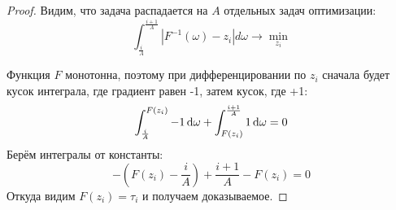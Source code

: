\begin{theorem}
\begin{proof}
Видим, что задача распадается на $A$ отдельных задач оптимизации:
\begin{equation}\label{w1minim}
\int_{\frac{i}{A}}^{\frac{i + 1}{A}} \left| F^{-1}(\omega) - z_i \right| d\omega \to \min_{z_i}
\end{equation}

Функция $F$ монотонна, поэтому при дифференцировании по $z_i$ сначала будет кусок интеграла, где градиент равен -1, затем кусок, где +1:
\begin{equation*}
\int_{\frac{i}{A}}^{F(z_i)} -1 \mathop{}\!\mathrm{d} \omega + \int_{F(z_i)}^{\frac{i+1}{A}} 1 \mathop{}\!\mathrm{d} \omega = 0
\end{equation*}
Берём интегралы от константы:
\begin{equation*}
-\left( F(z_i) - \frac{i}{A} \right) + \frac{i+1}{A} - F(z_i) = 0
\end{equation*}
Откуда видим $F(z_i) = \tau_i$ и получаем доказываемое.
\end{proof}
\end{theorem}




